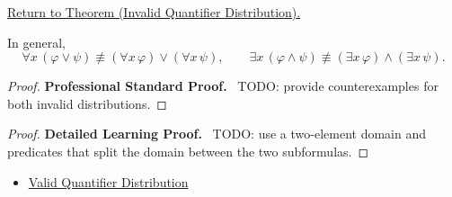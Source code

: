 \newpage
{}
\label{prf:invalid-quantifier-distribution}

\begin{remark*}[Return]
\hyperref[thm:invalid-quantifier-distribution]{Return to Theorem (Invalid Quantifier Distribution).}
\end{remark*}

\begin{theorem*}
In general,
\[
\forall x\,(\varphi\lor\psi)\not\equiv(\forall x\,\varphi)\lor(\forall x\,\psi),
\qquad
\exists x\,(\varphi\land\psi)\not\equiv(\exists x\,\varphi)\land(\exists x\,\psi).
\]
\end{theorem*}

\begin{proof}
\textbf{Professional Standard Proof.}~
TODO: provide counterexamples for both invalid distributions.
\end{proof}

\begin{proof}
\textbf{Detailed Learning Proof.}~
TODO: use a two-element domain and predicates that split the domain between
the two subformulas.
\end{proof}

\begin{remark*}
\end{remark*}

\begin{dependencies}
\begin{itemize}
  \item \hyperref[thm:qdist]{Valid Quantifier Distribution}
\end{itemize}
\end{dependencies}

\clearpage
